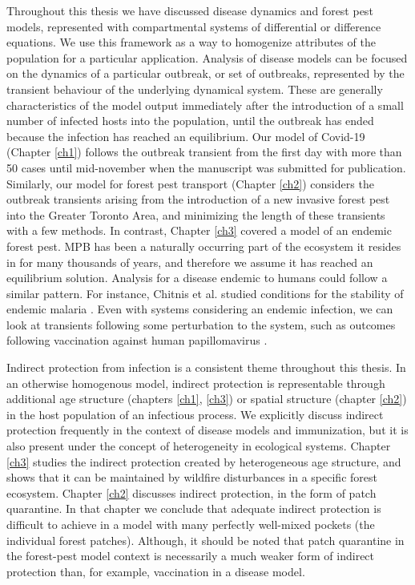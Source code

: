 Throughout this thesis we have discussed disease dynamics and forest pest models, represented with compartmental systems of differential or difference equations. We use this framework as a way to homogenize attributes of the population for a particular application. Analysis of disease models can be focused on the dynamics of a particular outbreak, or set of outbreaks, represented by the transient behaviour of the underlying dynamical system. These are generally characteristics of the model output immediately after the introduction of a small number of infected hosts into the population, until the outbreak has ended because the infection has reached an equilibrium. Our model of Covid-19 (Chapter \ref{ch1}) follows the outbreak transient from the first day with more than 50 cases until mid-november when the manuscript was submitted for publication. Similarly, our model for forest pest transport (Chapter \ref{ch2}) considers the outbreak transients arising from the introduction of a new invasive forest pest into the Greater Toronto Area, and minimizing the length of these transients with a few methods. In contrast, Chapter \ref{ch3} covered a model of an endemic forest pest. MPB has been a naturally occurring part of the ecosystem it resides in for many thousands of years, and therefore we assume it has reached an equilibrium solution. Analysis for a disease endemic to humans could follow a similar pattern. For instance, Chitnis et al. studied conditions for the stability of endemic malaria \cite{chitnis2006bifurcation}. Even with systems considering an endemic infection, we can look at transients following some perturbation to the system, such as outcomes following vaccination against human papillomavirus \cite{lee2012mathematical}. 

Indirect protection from infection is a consistent theme throughout this thesis. In an otherwise homogenous model, indirect protection is representable through additional age structure (chapters \ref{ch1}, \ref{ch3}) or spatial structure (chapter \ref{ch2}) in the host population of an infectious process. We explicitly discuss indirect protection frequently in the context of disease models and immunization, but it is also present under the concept of heterogeneity in ecological systems. Chapter \ref{ch3} studies the indirect protection created by heterogeneous age structure, and shows that it can be maintained by  wildfire disturbances in a specific forest ecosystem. Chapter \ref{ch2} discusses indirect protection, in the form of patch quarantine. In that chapter we conclude that adequate indirect protection is difficult to achieve in a model with many perfectly well-mixed pockets (the individual forest patches). Although, it should be noted that patch quarantine in the forest-pest model context is necessarily a much weaker form of indirect protection than, for example, vaccination in a disease model.

